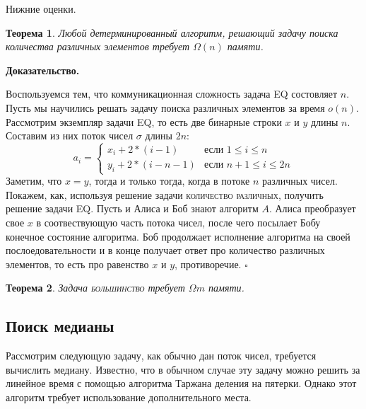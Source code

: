 \documentclass{article}
\newtheorem{theorem}{Теорема}
\newenvironment{proof}{\par\noindent%
{\bf Доказательство.\par\nopagebreak}}{\unskip\nobreak\enskip$\square$\par\bigskip}
\begin{document}
Нижние оценки.
\begin{theorem}
    Любой детерминированный алгоритм, решающий задачу поиска количества различных элементов
    требует $\Omega(n)$ памяти.
\end{theorem}

\begin{proof}
    Воспользуемся тем, что коммуникационная сложность задача \textsc{EQ} состовляет $n$.
    Пусть мы научились решать задачу поиска различных элементов за время $o(n)$.
    Рассмотрим экземпляр задачи \textsc{EQ}, то есть две бинарные строки $x$ и $y$ длины $n$.
    Составим из них поток чисел $\sigma$ длины $2n$:
    $$
        a_i = 
        \begin{cases}
            x_i + 2 * (i - 1) & \text{если $1 \leq i \leq n$} \\
            y_i + 2 * (i - n - 1) & \text{если $n + 1 \leq i \leq 2n$}
        \end{cases}
    $$
    Заметим, что $x = y$, тогда и только тогда, когда в потоке $n$ различных чисел.
    Покажем, как, используя решение задачи \textsc{количество различных}, получить решение задачи
    \textsc{EQ}. Пусть и Алиса и Боб знают алгоритм $A$. Алиса преобразует свое $x$ в
    соотвествующую часть потока чисел, после чего посылает Бобу конечное состояние алгоритма.
    Боб продолжает исполнение алгоритма на своей послоедовательности и в конце получает ответ про количество
    различных элементов, то есть про равенство $x$ и $y$, противоречие.
\end{proof}

\begin{theorem}
    Задача \textsc{большинство} требует $\Omega{m}$ памяти.
\end{theorem}



\subsection{Поиск медианы}

Рассмотрим следующую задачу, как обычно дан поток чисел, требуется
вычислить медиану. Известно, что в обычном случае эту задачу можно решить
за линейное время с помощью алгоритма Таржана деления на пятерки.
Однако этот алгоритм требует использование дополнительного места.
\end{document}
